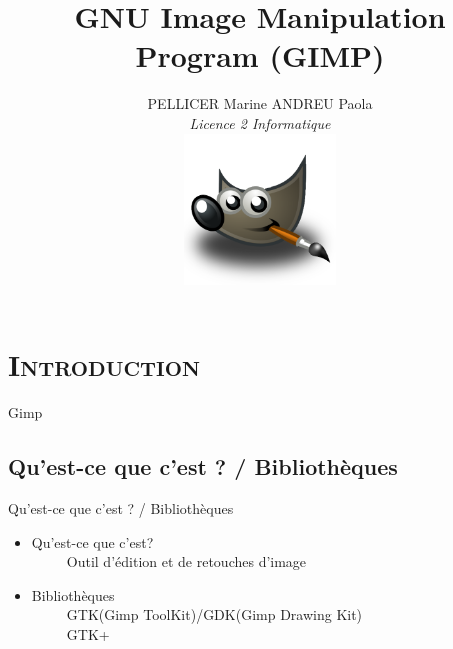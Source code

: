 \documentclass[xcolor=x11names,compress]{beamer}
\renewcommand{\(}{\begin{columns}}
\renewcommand{\)}{\end{columns}}
\newcommand{\<}[1]{\begin{column}{#1}}
\renewcommand{\>}{\end{column}}
\begin{document}
\section{\scshape Introduction}
\begin{frame}
\title{GNU Image Manipulation Program (GIMP)}
\author{
	PELLICER Marine ANDREU Paola\\
	{\it Licence 2 Informatique}\\
	\includegraphics[height=4cm]{wilber}
}

\titlepage
\end{frame}

\begin{frame}{Gimp}
\tableofcontents
\end{frame}

\subsection{Qu'est-ce que c'est ? / Bibliothèques}
\begin{frame}{Qu'est-ce que c'est ? / Bibliothèques}
\begin{itemize}
\item Qu'est-ce que c'est?\\
~~~~~Outil d'édition et de retouches d'image
\end{itemize}
\begin{itemize}
\item Bibliothèques\\
~~~~~GTK(Gimp ToolKit)/GDK(Gimp Drawing Kit)\\
~~~~~GTK+
\end{itemize}
\end{frame}

\end{document}
